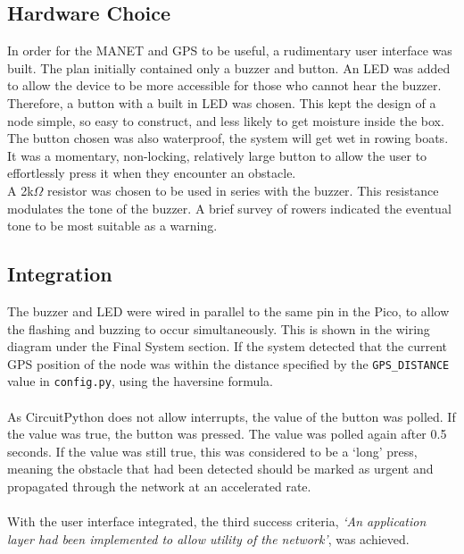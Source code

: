 \documentclass[12pt,a4paper]{report}
\begin{document}
\subsection{Hardware Choice}
In order for the MANET and GPS to be useful, a rudimentary user interface was built. The plan initially contained only a buzzer and button. An LED was added to allow the device to be more accessible for those who cannot hear the buzzer. 
Therefore, a button with a built in LED was chosen. This kept the design of a node simple, so easy to construct, and less likely to get moisture inside the box. The button chosen was also waterproof, the system will get wet in rowing boats. It was a momentary, non-locking, relatively large button to allow the user to effortlessly press it when they encounter an obstacle. \\
A 2k$\Omega$ resistor was chosen to be used in series with the buzzer. This resistance modulates the tone of the buzzer. A brief survey of rowers indicated the eventual tone to be most suitable as a warning. 

\subsection{Integration}
The buzzer and LED were wired in parallel to the same pin in the Pico, to allow the flashing and buzzing to occur simultaneously. This is shown in the wiring diagram under the Final System section. If the system detected that the current GPS position of the node was within the distance specified by the \verb'GPS_DISTANCE' value in \verb'config.py', using the haversine formula. \\ \\ 
As CircuitPython does not allow interrupts, the value of the button was polled. If the value was true, the button was pressed. The value was polled again after 0.5 seconds. If the value was still true, this was considered to be a `long' press, meaning the obstacle that had been detected should be marked as urgent and propagated through the network at an accelerated rate. \\ \\
With the user interface integrated, the third success criteria, \emph{`An application layer had been implemented to allow utility of the network'}, was achieved. 
\end{document}
